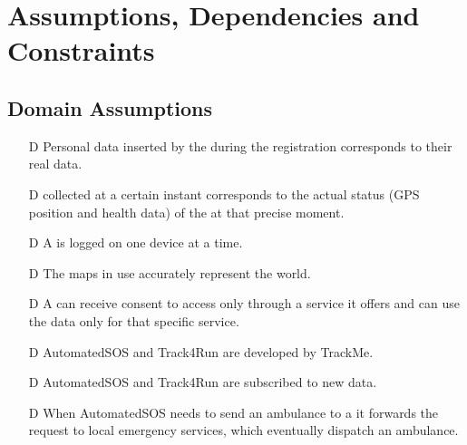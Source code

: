 \documentclass[../../rasd.tex]{subfiles}
\begin{document}
\section{Assumptions, Dependencies and Constraints}
		\subsection{Domain Assumptions}
			 	\begin{itemize}
				 	\item[D\subs{1}]Personal data inserted by the  during the registration corresponds to their real data.
					\item[D\subs{2}] collected at a certain instant corresponds to the actual status (GPS position and health data) of the  at that precise moment.				
					\item[D\subs{3}]A  is logged on one device at a time.
					\item[D\subs{4}]The maps in use accurately represent the world.
					\item[D\subs{5}]A  can receive consent to  access only through a service it offers and can use the data only for that specific service.
					\item[D\subs{6}]AutomatedSOS and Track4Run are  developed by TrackMe.
					\item[D\subs{7}]AutomatedSOS and Track4Run are subscribed to new data.
					\item[D\subs{8}]When AutomatedSOS needs to send an ambulance to a  it forwards the request to local emergency services, which eventually dispatch an ambulance.
				\end{itemize}		
\end{document}
